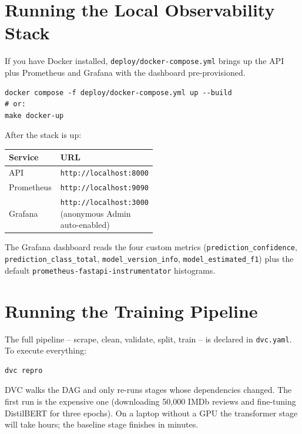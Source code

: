 \documentclass[11pt,a4paper]{article}
\begin{document}
\section{Running the Local Observability Stack}

If you have Docker installed, \texttt{deploy/docker-compose.yml} brings up the API
plus Prometheus and Grafana with the dashboard pre-provisioned.

\begin{lstlisting}
docker compose -f deploy/docker-compose.yml up --build
# or:
make docker-up
\end{lstlisting}

\noindent After the stack is up:

\begin{longtable}{@{}lp{0.5\linewidth}@{}}
\toprule
\textbf{Service} & \textbf{URL} \\ \midrule \endhead
API        & \texttt{http://localhost:8000} \\
Prometheus & \texttt{http://localhost:9090} \\
Grafana    & \texttt{http://localhost:3000} (anonymous Admin auto-enabled) \\
\bottomrule
\end{longtable}

\noindent The Grafana dashboard reads the four custom metrics
(\texttt{prediction\_confidence}, \texttt{prediction\_class\_total},
\texttt{model\_version\_info}, \texttt{model\_estimated\_f1}) plus the default
\texttt{prometheus-fastapi-instrumentator} histograms.

\section{Running the Training Pipeline}

The full pipeline -- scrape, clean, validate, split, train -- is declared in
\texttt{dvc.yaml}. To execute everything:

\begin{lstlisting}
dvc repro
\end{lstlisting}

\noindent DVC walks the DAG and only re-runs stages whose dependencies changed.
The first run is the expensive one (downloading 50{,}000 IMDb reviews and fine-tuning
DistilBERT for three epochs). On a laptop without a GPU the transformer stage will
take hours; the baseline stage finishes in minutes.
\end{document}
